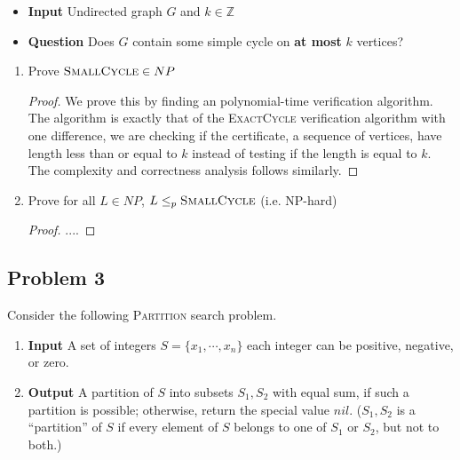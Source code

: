\documentclass[11pt]{article}
\begin{document}
\begin{enumerate}
    \begin{itemize}
        \item \textbf{Input} Undirected graph $G$ and $k\in \mathbb{Z}$
        \item \textbf{Question} Does $G$ contain some simple cycle on \textbf{at most} $k$ vertices?
    \end{itemize}
    \begin{solution}
        \begin{enumerate}
            \item Prove $\textsc{SmallCycle} \in NP$
            \begin{proof}
                We prove this by finding an polynomial-time verification algorithm. The algorithm is exactly that of the \textsc{ExactCycle} verification algorithm with one difference, we are checking if the certificate, a sequence of vertices, have length less than or equal to $k$ instead of testing if the length is equal to $k$. The complexity and correctness analysis follows similarly. 
            \end{proof}
            \item Prove for all $L\in NP$, $L\leq_p \textsc{SmallCycle}$  (i.e. NP-hard)
            \begin{proof}
               ....
            \end{proof}
        \end{enumerate}
    \end{solution}
    
\end{enumerate}


\subsection*{Problem 3}

Consider the following \textsc{Partition} search problem.
\begin{enumerate}
    \item \textbf{Input} A set of integers $S = \{ x_1, \cdots, x_n \}$ each integer can be positive, negative, or zero. 
    \item \textbf{Output} A partition of $S$ into subsets $S_1, S_2$ with equal sum, if such a partition is possible; otherwise, return the special value $nil$. ($S_1,S_2$ is a “partition” of $S$ if every element of $S$ belongs to one of $S_1$ or $S_2$, but not to both.)
\end{enumerate}
\end{document}
